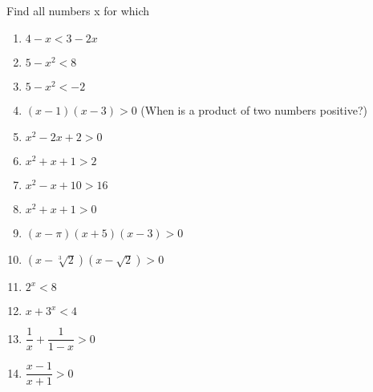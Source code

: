 \begin{pr}
  Find all numbers x for which
  \begin{enumerate}[label=(\roman*)]
    \item $4-x<3-2x$
    \item $5-x^2<8$
    \item $5-x^2<-2$
    \item $(x-1)(x-3)>0$ (When is a product of two numbers
    positive?)
    \item $x^2-2x+2>0$
    \item $x^2+x+1>2$
    \item $x^2-x+10>16$
    \item $x^2+x+1>0$
    \item $(x-\pi)(x+5)(x-3)>0$
    \item $(x-\sqrt[3]{2})(x-\sqrt{2})>0$
    \item $2^x<8$
    \item $x+3^x<4$
    \item $\dfrac{1}{x}+\dfrac{1}{1-x}>0$
    \nopagebreak[3]
    \item $\dfrac{x-1}{x+1}>0$
  \end{enumerate}
\end{pr}
\pagebreak
